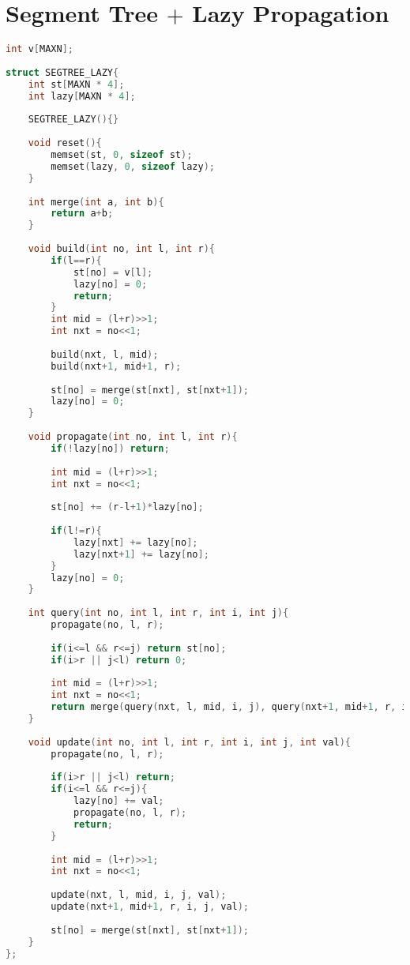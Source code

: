 \documentclass[12pt,a4paper,twoside]{report}
\begin{document}
\section{Segment Tree $+$ Lazy Propagation}
\noindent\begin{lstlisting}[caption=Segment Tree + Lazy Propagation,language=C++]
int v[MAXN];
 
struct SEGTREE_LAZY{
    int st[MAXN * 4];
    int lazy[MAXN * 4];
     
    SEGTREE_LAZY(){}
     
    void reset(){
        memset(st, 0, sizeof st);
        memset(lazy, 0, sizeof lazy);
    }
     
    int merge(int a, int b){
        return a+b;
    }
     
    void build(int no, int l, int r){
        if(l==r){
            st[no] = v[l];
            lazy[no] = 0;
            return;
        }
        int mid = (l+r)>>1;
        int nxt = no<<1;
         
        build(nxt, l, mid);
        build(nxt+1, mid+1, r);
         
        st[no] = merge(st[nxt], st[nxt+1]);
        lazy[no] = 0;
    }
         
    void propagate(int no, int l, int r){
        if(!lazy[no]) return;
         
        int mid = (l+r)>>1;
        int nxt = no<<1;
         
        st[no] += (r-l+1)*lazy[no];
         
        if(l!=r){
            lazy[nxt] += lazy[no];
            lazy[nxt+1] += lazy[no];
        }
        lazy[no] = 0;
    }  
     
    int query(int no, int l, int r, int i, int j){
        propagate(no, l, r);
         
        if(i<=l && r<=j) return st[no];
        if(i>r || j<l) return 0;
         
        int mid = (l+r)>>1;
        int nxt = no<<1;
        return merge(query(nxt, l, mid, i, j), query(nxt+1, mid+1, r, i, j));
    }
 
    void update(int no, int l, int r, int i, int j, int val){
        propagate(no, l, r);
         
        if(i>r || j<l) return;
        if(i<=l && r<=j){
            lazy[no] += val;
            propagate(no, l, r);
            return;
        }
         
        int mid = (l+r)>>1;
        int nxt = no<<1;
         
        update(nxt, l, mid, i, j, val);
        update(nxt+1, mid+1, r, i, j, val);
         
        st[no] = merge(st[nxt], st[nxt+1]);
    }
};
\end{lstlisting}
\end{document}
